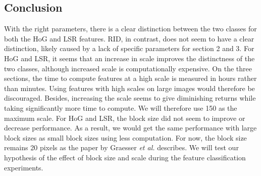 \subsection{Conclusion}

With the right parameters, there is a clear distinction between the two classes for both the HoG and LSR features. RID, in contrast, does not seem to have a clear distinction, likely caused by a lack of specific parameters for section 2 and 3. For HoG and LSR, it seems that an increase in scale improves the distinctness of the two classes, although increased scale is computationally expensive. On the three sections, the time to compute features at a high scale is measured in hours rather than minutes. Using features with high scales on large images would therefore be discouraged. Besides, increasing the scale seems to give diminishing returns while taking significantly more time to compute. We will therefore use 150 as the maximum scale.
For HoG and LSR, the block size did not seem to improve or decrease performance. As a result, we would get the same performance with large block sizes as small block sizes using less computation. For now, the block size remains 20 pixels as the paper by Graesser \textit{et al.} describes. We will test our hypothesis of the effect of block size and scale during the feature classification experiments.


